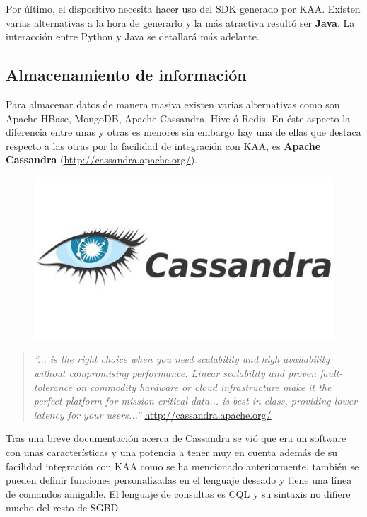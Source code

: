 \bigskip
Por último, el dispositivo necesita hacer uso del SDK generado por KAA. Existen varias alternativas a la hora de generarlo y la más atractiva resultó ser \textbf{Java}. La interacción entre Python y Java se detallará más adelante.

\subsection{Almacenamiento de información}

Para almacenar datos de manera masiva existen varias alternativas como son Apache HBase, MongoDB, Apache Cassandra, Hive ó Redis. En éste aspecto la diferencia entre unas y otras es menores sin embargo hay una de ellas que destaca respecto a las otras por la facilidad de integración con KAA, es \textbf{Apache Cassandra} (\url{http://cassandra.apache.org/}).

\begin{figure}[!ht]
  \begin{center}
    \includegraphics[scale=0.60]{../images/cassandra/logo.jpg}
    \label{fig:cassalog}
	\end{center}
\end{figure}

\begin{quote}\textit{ ''... is the right choice when you need scalability and high availability without compromising performance. Linear scalability and proven fault-tolerance on commodity hardware or cloud infrastructure make it the perfect platform for mission-critical data... is best-in-class, providing lower latency for your users...''
}
\newline
\url{http://cassandra.apache.org/}
\end{quote}

Tras una breve documentación acerca de Cassandra se vió que era un software con unas características y una potencia a tener muy en cuenta además de su facilidad integración con KAA como se ha mencionado anteriormente, también se pueden definir funciones personalizadas en el lenguaje deseado y tiene una línea de comandos amigable. El lenguaje de consultas es CQL y su sintaxis no difiere mucho del resto de SGBD.


